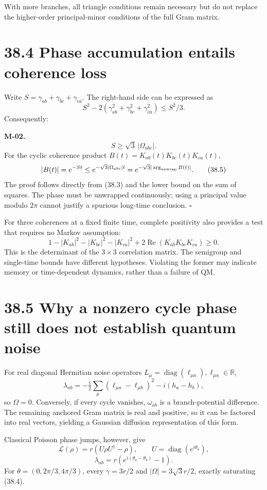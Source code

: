 \documentclass[
  11pt,
  oneside]{book}
\begin{document}
With more branches, all triangle conditions remain necessary but do not
replace the higher-order principal-minor conditions of the full Gram
matrix.

\section{38.4 Phase accumulation entails coherence loss}

Write \(S=\gamma_{ab}+\gamma_{bc}+\gamma_{ca}\). The right-hand side can
be expressed as \[
S^2-2(\gamma_{ab}^2+\gamma_{bc}^2+\gamma_{ca}^2)\le S^2/3.
\] Consequently:

\label{m-02}{}

\textbf{M-02.} \[
S\ge\sqrt3\,|\Omega_{abc}|.
\tag{38.4}
\] For the cyclic coherence product
\(B(t)=K_{ab}(t)K_{bc}(t)K_{ca}(t)\), \[
|B(t)|=e^{-St}
\le e^{-\sqrt3|\Omega_{abc}|t}
=e^{-\sqrt3|\arg_{\rm unwrap} B(t)|}.
\tag{38.5}
\] The proof follows directly from (38.3) and the lower bound on the sum
of squares. The phase must be unwrapped continuously; using a principal
value modulo \(2\pi\) cannot justify a spurious long-time conclusion.
\(\square\)

For three coherences at a fixed finite time, complete positivity also
provides a test that requires no Markov assumption: \[
1-|K_{ab}|^2-|K_{bc}|^2-|K_{ca}|^2
+2\operatorname{Re}(K_{ab}K_{bc}K_{ca})\ge0.
\tag{38.6}
\] This is the determinant of the \(3\times3\) correlation matrix. The
semigroup and single-time bounds have different hypotheses. Violating
the former may indicate memory or time-dependent dynamics, rather than a
failure of QM.

\section{38.5 Why a nonzero cycle phase still does not establish quantum
noise}

For real diagonal Hermitian noise operators
\(L_\mu=\operatorname{diag}(\ell_{\mu a}),\ell_{\mu a}\in\mathbb R\), \[
\lambda_{ab}=-\tfrac12\sum_\mu(\ell_{\mu a}-\ell_{\mu b})^2
-i(h_a-h_b),
\] so \(\Omega=0\). Conversely, if every cycle vanishes, \(\omega_{ab}\)
is a branch-potential difference. The remaining anchored Gram matrix is
real and positive, so it can be factored into real vectors, yielding a
Gaussian diffusion representation of this form.

Classical Poisson phase jumps, however, give \[
\mathcal L(\rho)=r(U\rho U^\dagger-\rho),\qquad
U=\operatorname{diag}(e^{i\theta_a}),
\] \[
\lambda_{ab}=r(e^{i(\theta_a-\theta_b)}-1).
\tag{38.7}
\] For \(\theta=(0,2\pi/3,4\pi/3)\), every \(\gamma=3r/2\) and
\(|\Omega|=3\sqrt3r/2\), exactly saturating (38.4).
\end{document}
